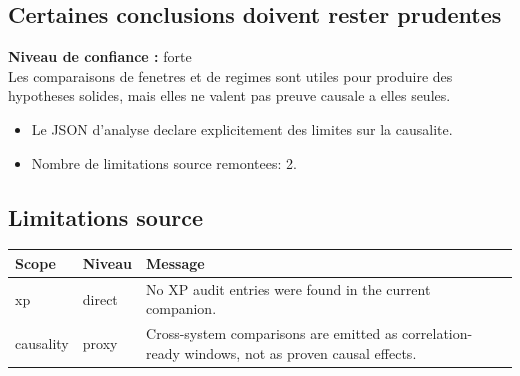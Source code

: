 \documentclass[11pt,a4paper]{article}
\begin{document}
\subsection*{Certaines conclusions doivent rester prudentes}
\textbf{Niveau de confiance :} forte\\
Les comparaisons de fenetres et de regimes sont utiles pour produire des hypotheses solides, mais elles ne valent pas preuve causale a elles seules.
\begin{itemize}
\item Le JSON d'analyse declare explicitement des limites sur la causalite.
\item Nombre de limitations source remontees: 2.
\end{itemize}
\subsection*{Limitations source}
\begin{tabularx}{\linewidth}{X|X|X}
\toprule
Scope & Niveau & Message \\
\midrule
xp & direct & No XP audit entries were found in the current companion. \\
causality & proxy & Cross-system comparisons are emitted as correlation-ready windows, not as proven causal effects. \\
\bottomrule
\end{tabularx}
\end{document}
